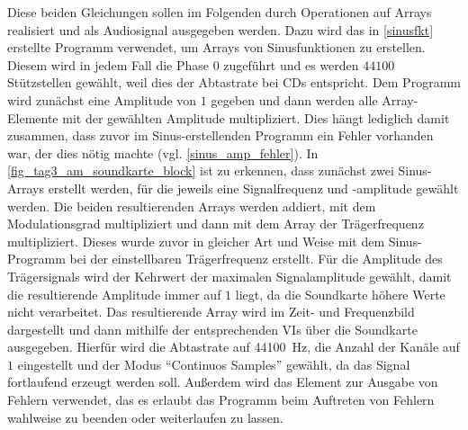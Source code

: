 \documentclass[
a4paper,
12pt,
pagesize,
ngerman
]{scrartcl}
\begin{document}
	Diese beiden Gleichungen sollen im Folgenden durch Operationen auf Arrays realisiert und als Audiosignal ausgegeben werden.	
	Dazu wird das in \cref{sinusfkt} erstellte Programm verwendet, um Arrays von Sinusfunktionen zu erstellen.
	Diesem wird in jedem Fall die Phase $0$ zugeführt und es werden $44100$ Stützstellen gewählt, weil dies der Abtastrate bei CDs entspricht.
	Dem Programm wird zunächst eine Amplitude von $1$ gegeben und dann werden alle Array-Elemente mit der gewählten Amplitude multipliziert.
	Dies hängt lediglich damit zusammen, dass zuvor im Sinus-erstellenden Programm ein Fehler vorhanden war, der dies nötig machte (vgl. \cref{sinus_amp_fehler}).
	In \cref{fig_tag3_am_soundkarte_block} ist zu erkennen, dass zunächst zwei Sinus-Arrays erstellt werden, für die jeweils eine Signalfrequenz und -amplitude gewählt werden.
	Die beiden resultierenden Arrays werden addiert, mit dem Modulationsgrad multipliziert und dann mit dem Array der Trägerfrequenz multipliziert.
	Dieses wurde zuvor in gleicher Art und Weise mit dem Sinus-Programm bei der einstellbaren Trägerfrequenz erstellt.
	Für die Amplitude des Trägersignals wird der Kehrwert der maximalen Signalamplitude gewählt, damit die resultierende Amplitude immer auf $1$ liegt, da die Soundkarte höhere Werte nicht verarbeitet.
	Das resultierende Array wird im Zeit- und Frequenzbild dargestellt und dann mithilfe der entsprechenden VIs über die Soundkarte ausgegeben.
	Hierfür wird die Abtastrate auf \SI{44100}{\hertz}, die Anzahl der Kanäle auf $1$ eingestellt und der Modus \enquote{Continuos Samples} gewählt, da das Signal fortlaufend erzeugt werden soll.
	Außerdem wird das Element zur Ausgabe von Fehlern verwendet, das es erlaubt das Programm beim Auftreten von Fehlern wahlweise zu beenden oder weiterlaufen zu lassen. %
	
\end{document}
